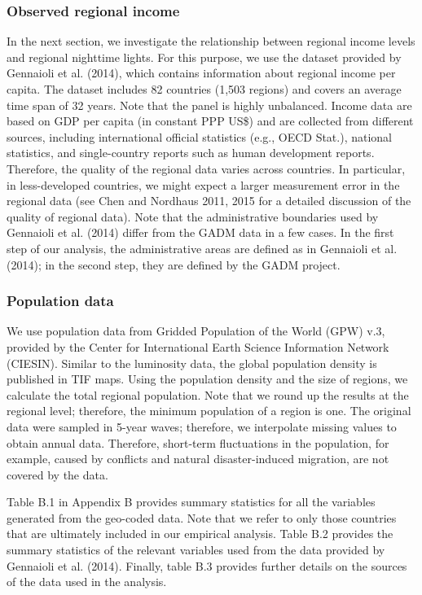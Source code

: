 \documentclass[10pt]{article}
\begin{document}
\subsubsection{Observed regional income}
In the next section, we investigate the relationship between regional income levels and regional nighttime lights. For this purpose, we use the dataset provided by Gennaioli et al. (2014), which contains information about regional income per capita. The dataset includes 82 countries (1,503 regions) and covers an average time span of 32 years. Note that the panel is highly unbalanced. Income data are based on GDP per capita (in constant PPP US\$) and are collected from different sources, including international official statistics (e.g., OECD Stat.), national statistics, and single-country reports such as human development reports. Therefore, the quality of the regional data varies across countries. In particular, in less-developed countries, we might expect a larger measurement error in the regional data (see Chen and Nordhaus 2011, 2015 for a detailed discussion of the quality of regional data). Note that the administrative boundaries used by Gennaioli et al. (2014) differ from the GADM data in a few cases. In the first step of our analysis, the administrative areas are defined as in Gennaioli et al. (2014); in the second step, they are defined by the GADM project.

\subsubsection{Population data}
We use population data from Gridded Population of the World (GPW) v.3, provided by the Center for International Earth Science Information Network (CIESIN). Similar to the luminosity data, the global population density is published in TIF maps. Using the population density and the size of regions, we calculate the total regional population. Note that we round up the results at the regional level; therefore, the minimum population of a region is one. The original data were sampled in 5-year waves; therefore, we interpolate missing values to obtain annual data. Therefore, short-term fluctuations in the population, for example, caused by conflicts and natural disaster-induced migration, are not covered by the data.

Table B.1 in Appendix B provides summary statistics for all the variables generated from the geo-coded data. Note that we refer to only those countries that are ultimately included in our empirical analysis. Table B.2 provides the summary statistics of the relevant variables used from the data provided by Gennaioli et al. (2014). Finally, table B.3 provides further details on the sources of the data used in the analysis.
\end{document}
